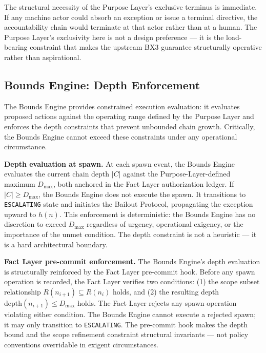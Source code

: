 The structural necessity of the Purpose Layer's exclusive terminus is immediate. If any machine actor could absorb an exception or issue a terminal directive, the accountability chain would terminate at that actor rather than at a human. The Purpose Layer's exclusivity here is not a design preference --- it is the load-bearing constraint that makes the upstream BX3 guarantee structurally operative rather than aspirational.

\subsection{Bounds Engine: Depth Enforcement}
\label{sec:rs-bounds-depth}

The Bounds Engine provides constrained execution evaluation: it evaluates proposed actions against the operating range defined by the Purpose Layer and enforces the depth constraints that prevent unbounded chain growth. Critically, the Bounds Engine cannot exceed these constraints under any operational circumstance.

\medskip
\noindent\textbf{Depth evaluation at spawn.} At each spawn event, the Bounds Engine evaluates the current chain depth $|C|$ against the Purpose-Layer-defined maximum $D_{\mathrm{max}}$, both anchored in the Fact Layer authorization ledger. If $|C| \geq D_{\mathrm{max}}$, the Bounds Engine does not execute the spawn. It transitions to \texttt{ESCALATING} state and initiates the Bailout Protocol, propagating the exception upward to $h(n)$. This enforcement is deterministic: the Bounds Engine has no discretion to exceed $D_{\mathrm{max}}$ regardless of urgency, operational exigency, or the importance of the unmet condition. The depth constraint is not a heuristic --- it is a hard architectural boundary.

\medskip
\noindent\textbf{Fact Layer pre-commit enforcement.} The Bounds Engine's depth evaluation is structurally reinforced by the Fact Layer pre-commit hook. Before any spawn operation is recorded, the Fact Layer verifies two conditions: (1) the scope subset relationship $R(n_{i+1}) \subseteq R(n_i)$ holds, and (2) the resulting depth $\mathrm{depth}(n_{i+1}) \leq D_{\mathrm{max}}$ holds. The Fact Layer rejects any spawn operation violating either condition. The Bounds Engine cannot execute a rejected spawn; it may only transition to \texttt{ESCALATING}. The pre-commit hook makes the depth bound and the scope refinement constraint structural invariants --- not policy conventions overridable in exigent circumstances.

